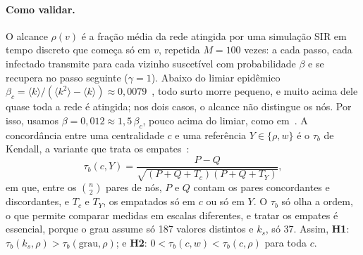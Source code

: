 \paragraph{Como validar.} O alcance $\rho(v)$ é a fração média da rede atingida por uma simulação SIR
em tempo discreto que começa só em $v$, repetida $M = 100$ vezes: a cada passo, cada infectado
transmite para cada vizinho suscetível com probabilidade $\beta$ e se recupera no passo seguinte
($\gamma = 1$). Abaixo do limiar epidêmico
$\beta_c = \langle k \rangle / (\langle k^2 \rangle - \langle k \rangle) \approx 0{,}0079$~\cite{newman2002},
todo surto morre pequeno, e muito acima dele quase toda a rede é atingida; nos dois casos, o alcance
não distingue os nós. Por isso, usamos $\beta = 0{,}012 \approx 1{,}5\,\beta_c$, pouco acima do
limiar, como em~\cite{kitsak2010}. A concordância entre uma centralidade $c$ e uma referência
$Y \in \{\rho, w\}$ é o $\tau_b$ de Kendall, a variante que trata os empates~\cite{kendall1945}:
\[
  \tau_b(c, Y) = \frac{P - Q}{\sqrt{(P + Q + T_c)(P + Q + T_Y)}},
\]
em que, entre os $\binom{n}{2}$ pares de nós, $P$ e $Q$ contam os pares concordantes e discordantes,
e $T_c$ e $T_Y$, os empatados só em $c$ ou só em $Y$. O $\tau_b$ só olha a ordem, o que permite
comparar medidas em escalas diferentes, e tratar os empates é essencial, porque o grau assume só 187
valores distintos e $k_s$, só 37. Assim, \textbf{H1}: $\tau_b(k_s, \rho) > \tau_b(\text{grau}, \rho)$;
e \textbf{H2}: $0 < \tau_b(c, w) < \tau_b(c, \rho)$ para toda $c$.
